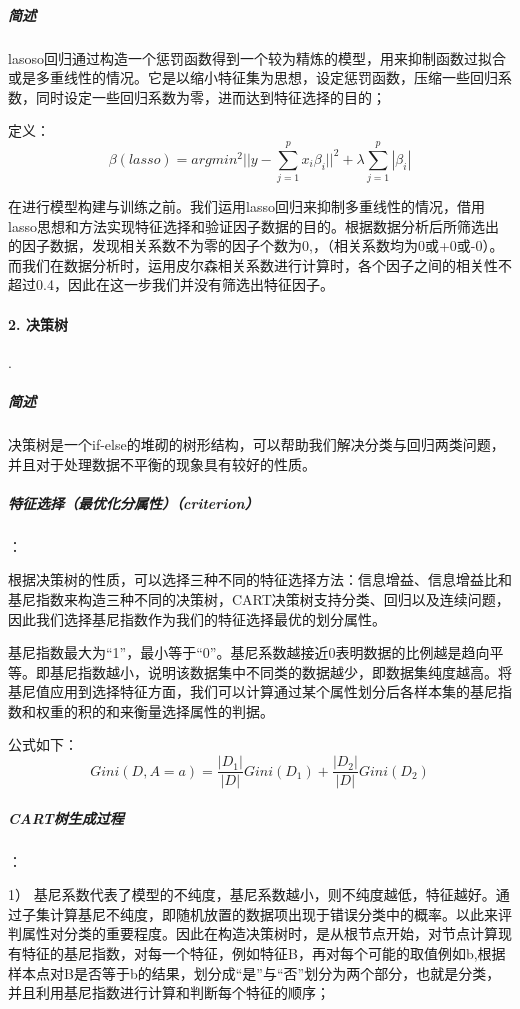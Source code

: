\documentclass[lang=cn,12pt]{elegantpaper}
\begin{document}
\subparagraph{简述}

lasoso回归通过构造一个惩罚函数得到一个较为精炼的模型，用来抑制函数过拟合或是多重线性的情况。它是以缩小特征集为思想，设定惩罚函数，压缩一些回归系数，同时设定一些回归系数为零，进而达到特征选择的目的；

定义：
\begin{equation}
\nonumber \beta (lasso)= argmin^2||y-\sum_{j=1}
^px_i\beta_i||^2+\lambda\sum_{j=1}^p|\beta_i|
\end{equation}

在进行模型构建与训练之前。我们运用lasso回归来抑制多重线性的情况，借用lasso思想和方法实现特征选择和验证因子数据的目的。根据数据分析后所筛选出的因子数据，发现相关系数不为零的因子个数为0,，（相关系数均为0或+0或-0）。而我们在数据分析时，运用皮尔森相关系数进行计算时，各个因子之间的相关性不超过0.4，因此在这一步我们并没有筛选出特征因子。

\paragraph{2. 决策树}.

\subparagraph{简述}
决策树是一个if-else的堆砌的树形结构，可以帮助我们解决分类与回归两类问题，并且对于处理数据不平衡的现象具有较好的性质。

\subparagraph{特征选择（最优化分属性）（criterion）}：

根据决策树的性质，可以选择三种不同的特征选择方法：信息增益、信息增益比和基尼指数来构造三种不同的决策树，CART决策树支持分类、回归以及连续问题，因此我们选择基尼指数作为我们的特征选择最优的划分属性。

基尼指数最大为“1”，最小等于“0”。基尼系数越接近0表明数据的比例越是趋向平等。即基尼指数越小，说明该数据集中不同类的数据越少，即数据集纯度越高。将基尼值应用到选择特征方面，我们可以计算通过某个属性划分后各样本集的基尼指数和权重的积的和来衡量选择属性的判据。

公式如下：
\begin{equation}
\nonumber Gini(D,A=a)=\frac{|D_1|}{|D|}Gini(D_1)+\frac{|D_2|}{|D|}Gini(D_2)
\end{equation}


\subparagraph{CART树生成过程}\cite{机器学习}：

1） 基尼系数代表了模型的不纯度，基尼系数越小，则不纯度越低，特征越好。通过子集计算基尼不纯度，即随机放置的数据项出现于错误分类中的概率。以此来评判属性对分类的重要程度。因此在构造决策树时，是从根节点开始，对节点计算现有特征的基尼指数，对每一个特征，例如特征B，再对每个可能的取值例如b,根据样本点对B是否等于b的结果，划分成“是”与“否”划分为两个部分，也就是分类，并且利用基尼指数进行计算和判断每个特征的顺序；
\end{document}
